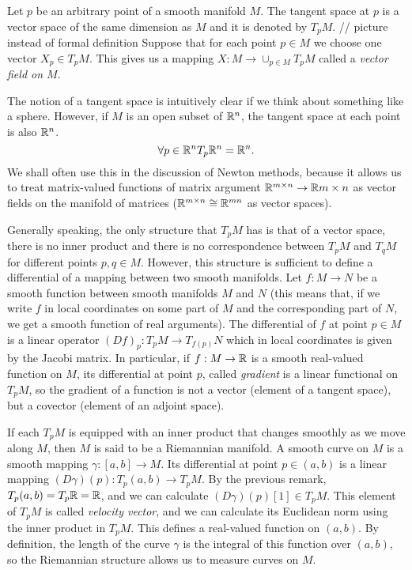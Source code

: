 Let $p$ be an arbitrary point of a smooth manifold $M$. The tangent space at $p$
is a vector space of the same dimension as $M$ and it is denoted by $T_pM$.
// picture instead of formal definition
Suppose that for each point $p \in M$ we choose one vector $X_p \in T_pM$. 
This gives us a mapping $X: M \to \cup_{p \in M} T_pM$ called a
\textit{vector field on $M$}.


The notion of a tangent space is intuitively clear if we think about something like a sphere.
However, if $M$ is an open subset of $\mathbb{R}^n$, the tangent space at each point
is also $\mathbb{R}^n$.
\begin{equation}
    \forall p \in \mathbb{R}^n T_p\mathbb{R}^n = \mathbb{R}^n.
\end{equation}
We shall often use this in the discussion of Newton methods, because
it allows us to treat matrix-valued functions of matrix argument $\mathbb{R}^{m \times n} \to \mathbb{R}{m \times n}$
as vector fields on the manifold of matrices ($\mathbb{R}^{m \times n} \cong \mathbb{R}^{mn}$ as vector spaces).


Generally speaking, the only structure that $T_pM$ has is that of a vector space, there is no
inner product and there is no correspondence between $T_pM$ and $T_qM$ for different
points $p, q \in M$. However, this structure is sufficient to define a differential
of a mapping between two smooth manifolds. Let $f : M \to N$ be a smooth
function between smooth manifolds $M$ and $N$ (this means that, if we write
$f$ in local coordinates on some part of $M$ and the corresponding part of $N$,
we get a smooth function of real arguments). The differential of $f$
at point $p \in M$ is a linear operator $(Df)_p : T_pM \to T_{f(p)}N$ which in
local coordinates is given by the Jacobi matrix. In particular,
if $f : M \to \mathbb{R}$ is a smooth real-valued function on $M$, its differential at point $p$,
called \textit{gradient} is a linear functional on $T_pM$,
so the gradient of a function is not a vector (element of a tangent space),
but a covector (element of an adjoint space).



If each $T_pM$ is equipped with an inner product
that changes smoothly as we move along $M$, then $M$ is said to be a Riemannian manifold.
A smooth curve on $M$ is a smooth mapping $\gamma : [a, b] \rightarrow M$.
Its differential at point $p \in (a, b)$ is a linear mapping $(D\gamma)(p) : T_p(a,b) \to T_pM$.
By the previous remark, $T_p(a, b) = T_p \mathbb{R} = \mathbb{R}$, and we can calculate $(D\gamma)(p)[1] \in T_pM$.
This element of $T_pM$ is called \textit{velocity vector}, and we can calculate
its Euclidean norm using the inner product in $T_pM$. This defines a real-valued function
on $(a, b)$. By definition, the length of the curve $\gamma$ is the integral
of this function over $(a,b)$, so the Riemannian structure allows us to measure curves on $M$.



